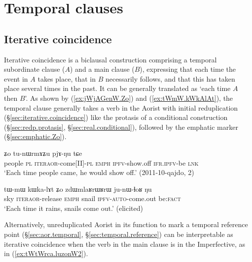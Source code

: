   
 
 \section{Temporal clauses} \label{sec:temporal.clauses}

 

 \subsection{Iterative coincidence} \label{sec:iterative.coincidence.clause}
Iterative coincidence is a biclausal construction comprising a temporal subordinate clause ($A$) and a main clause ($B$), expressing that each time the event in $A$ takes place, that in $B$ necessarily follows, and that this has taken place several times in the past. It can be generally translated as `each time $A$ then $B$'. As shown by (\ref{ex:jWjAGenW.Zo}) and (\ref{ex:tWmW.kWkAlAt}), the temporal clause generally takes a verb in the Aorist with initial reduplication (§\ref{sec:iterative.coincidence}) like the protasis of a conditional construction (§\ref{sec:redp.protasis}, §\ref{sec:real.conditional}), followed by the emphatic marker  (§\ref{sec:emphatic.Zo}).

 
\begin{exe}
\ex \label{ex:jWjAGenW.Zo}
 ʑo tu-nɯrmɤʑu pjɤ-ŋu tɕe \\
people \textsc{pl}  \textsc{iter}\redp{}\textsc{aor}-come[II]-\textsc{pl} \textsc{emph} \textsc{ipfv}-show.off \textsc{ifr}.\textsc{ipfv}-be \textsc{lnk} \\
\glt `Each time people came, he would show off.' (2011-10-qajdo, 2)
\end{exe}

\begin{exe}
   \ex \label{ex:tWmW.kWkAlAt}
   \gll  tɯ-mɯ  kɯ\redp{}ka-lɤt ʑo zdɯmlaʁrɯʁrɯ ju-nɯ-ɬoʁ ŋu   \\
sky \textsc{iter}\redp{}\textsc{aor}-release \textsc{emph} snail \textsc{ipfv}-\textsc{auto}-come.out be:\textsc{fact} \\
\glt `Each time it rains,  snails come out.' (elicited)
\end{exe}

Alternatively, unreduplicated Aorist in its function to mark a temporal reference point (§\ref{sec:aor.temporal}, §\ref{sec:temporal.reference}) can be interpretable as  iterative coincidence when the verb in the main clause is in the Imperfective, as in (\ref{ex:tWtWrca.luzonW2}). 

